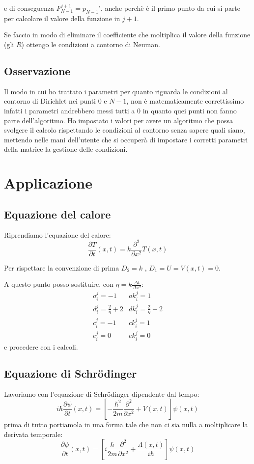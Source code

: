 \documentclass[]{article}
\newcommand{\pde}[2]{\ensuremath{\frac{\partial #1}{\partial #2}}}
\newcommand{\lr}[3]{\ensuremath{\left#1 #3 \right#2}}
\newcommand{\lrq}[1]{\lr{[}{]}{#1}}
\newcommand{\Schrodinger}{Schr\"{o}dinger }
\numberwithin{equation}{subsection}
\begin{document}
e di conseguenza $F_{N-1}^{j+1} = p_{N-1}'$, anche perch\`e \`e il primo punto da cui si parte per calcolare il valore della funzione in $j+1$.

Se faccio in modo di eliminare il coefficiente che moltiplica il valore della funzione (gli $R$) ottengo le condizioni a  contorno di Neuman.
\subsection{Osservazione}
Il modo in cui ho trattato i parametri per quanto riguarda le condizioni al contorno di Dirichlet nei punti $0$ e $N-1$, non \`e matematicamente correttissimo infatti i parametri andrebbero messi tutti a 0 in quanto quei punti non fanno parte dell'algoritmo. Ho impostato i valori  per avere un algoritmo che possa svolgere il calcolo rispettando le condizioni al contorno senza sapere quali siano, mettendo nelle mani dell'utente che si occuper\`a di impostare i corretti parametri della matrice la gestione delle condizioni.
\section{Applicazione}
\subsection{Equazione del calore}
Riprendiamo l'equazione del calore:
\begin{equation}
\pde T t(x,t) =k\pde{^2}{x^2}T(x,t)
\end{equation}

Per rispettare la convenzione di prima $D_2 = k$ , $D_1 = U = V(x,t) = 0$. 


A questo punto posso sostituire, con $\eta = k\frac{\Delta t}{\Delta x^2}$:
\begin{equation}\label{eq:pararametriHeat}
\begin{array}{ll}
a_i^j = -1            & ak_i^j =1\\
d_i^j = \frac2\eta +2 & dk_i^j = \frac2\eta -2 \\
c_i^j = -1             & ck_i^j =1\\
e_i^j = 0             & ek_i^j =0
\end{array}
\end{equation}
e procedere con i calcoli.
\subsection{Equazione di \Schrodinger}
Lavoriamo con l'equazione di \Schrodinger  dipendente dal tempo:
\begin{equation}
i\hbar\pde \psi t(x,t) =\lrq{-\frac{\hbar^2}{2m}\pde{^2}{x^2}+V(x,t)} \psi(x,t)
\end{equation}
prima di tutto portiamola in una forma tale che non ci sia nulla a moltiplicare la derivata temporale:
\begin{equation}
\pde \psi t(x,t) =\lrq{i\frac{\hbar}{2m}\pde{^2}{x^2}+\frac{\varLambda(x,t)}{i\hbar}} {\psi(x,t)}
\end{equation} 
\end{document}
